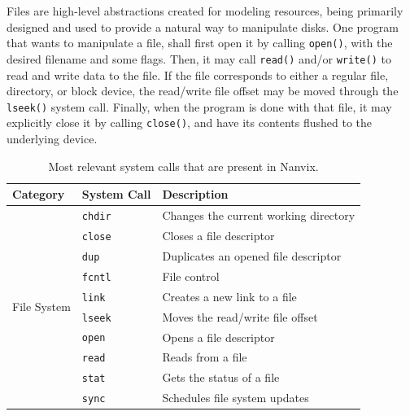 \documentclass[10pt,a4paper]{article}
\begin{document}
Files are high-level abstractions created for modeling resources, being primarily designed and used to provide a natural way to manipulate disks. One program that wants to manipulate a file, shall first open it by calling \texttt{open()}, with the desired filename and some flags. Then, it may call \texttt{read()} and/or \texttt{write()} to read and write data to the file. If the file corresponds to either a regular file, directory, or block device, the read/write file offset may be moved through the \texttt{lseek()} system call. Finally, when the program is done with that file, it may explicitly close it by calling \texttt{close()}, and have its contents flushed to the underlying device.


\begin{table}[b]
\small
\centering
\caption{Most relevant system calls that are present in Nanvix.}
\label{table: most relevant system calls in nanvix}
\begin{tabular}{l l l}
	\toprule
	Category & System Call & Description \\
	\midrule
	\multirow{16}{*}{File System}        & \texttt{chdir}    & Changes the current working directory               \\
	                                     & \texttt{close}    & Closes a file descriptor                            \\
	                                     & \texttt{dup}      & Duplicates an opened file descriptor                \\
	                                     & \texttt{fcntl}    & File control                                        \\
	                                     & \texttt{link}     & Creates a new link to a file                        \\
	                                     & \texttt{lseek}    & Moves the read/write file offset                    \\
	                                     & \texttt{open}     & Opens a file descriptor                             \\
	                                     & \texttt{read}     & Reads from a file                                   \\
	                                     & \texttt{stat}     & Gets the status of a file                           \\
	                                     & \texttt{sync}     & Schedules file system updates                       \\

\end{tabular}
\end{table}
\end{document}
